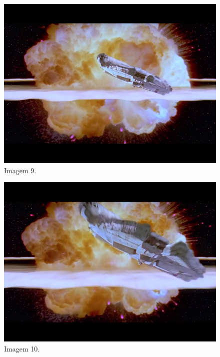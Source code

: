 \documentclass[14pt, oneside]{book}
\theoremstyle{definition}
\begin{document}
\begin{multicols}{2}
                     \begin{figure}[H]
                        \centering
                        \includegraphics[scale=0.65]{img9.png}
                        \caption{Imagem 9.}
                        \label{manual}
                     \end{figure}
                
                    \begin{figure}[H]
                        \centering
                        \includegraphics[scale=0.65]{img10.png}
                        \caption{Imagem 10.}
                        \label{manual}
                    \end{figure}
                
                
                \end{multicols}
               
\end{document}

